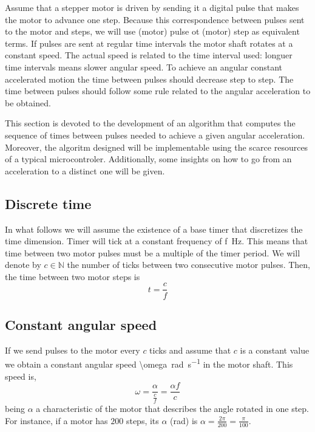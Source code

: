 \documentclass[a4paper]{article}
\newcommand{\vSI}[2]{\SI[math-rm=\ensuremath,parse-numbers=false]{#1}{#2}}
\begin{document}
Assume that a stepper motor is driven by sending it a digital pulse
that makes the motor to advance one step. Because this correspondence
between pulses sent to the motor and steps, we will use (motor) pulse ot
(motor) step as equivalent terms. If pulses are sent at regular time
intervals the motor shaft rotates at a constant speed. The actual
speed is related to the time interval used: longuer time intervals
means slower angular speed.
%
To achieve an angular constant accelerated motion the time between
pulses should decrease step to step. The time between pulses should
follow some rule related to the angular acceleration to be obtained.

This section is devoted to the development of an algorithm that
computes the sequence of times between pulses needed to achieve a
given angular acceleration. Moreover, the algoritm designed will be
implementable using the scarce resources of a typical
microcontroler. Additionally, some insights on how to go from an
acceleration to a distinct one will be given.


\subsection{Discrete time}

In what follows we will assume the existence of a base timer that
discretizes the time dimension. Timer will tick at a constant
frequency of \vSI{f}{\hertz}. This means that time between two motor
pulses must be a multiple of the timer period. We will denote by
$c\in\mathbb{N}$ the number of ticks between two consecutive motor
pulses. Then, the time between two motor steps is
\begin{equation}
  \label{eq:4}
  t = \frac{c}{f}  
\end{equation}

\subsection{Constant angular speed}

If we send pulses to the motor every $c$ ticks and assume that $c$ is
a constant value we obtain a constant angular speed
\vSI{\omega}{\radian\per\second} in the motor shaft. This speed is,
\begin{equation}
  \label{eq:5}
  \omega = \frac{\alpha}{\frac{c}{f}} = \frac{\alpha f}{c}  
\end{equation}
being $\alpha$ a characteristic of the motor that describes the angle
rotated in one step. For instance, if a motor has $200$ steps, its
$\alpha$ (\si{\radian}) is
$\alpha = \frac{2\pi}{200} = \frac{\pi}{100}$.
\end{document}
